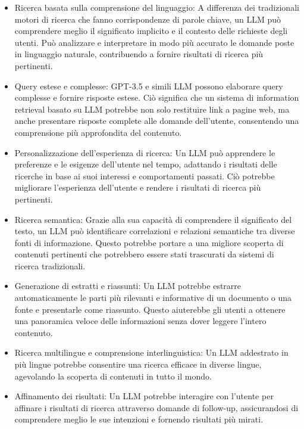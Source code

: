 \begin{itemize}
    \item Ricerca basata sulla comprensione del linguaggio: 
    A differenza dei tradizionali motori di ricerca che fanno corrispondenze di parole chiave, un LLM può comprendere meglio il significato implicito e il contesto delle richieste degli utenti. Può analizzare e interpretare in modo più accurato le domande poste in linguaggio naturale, contribuendo a fornire risultati di ricerca più pertinenti.
    \item Query estese e complesse: GPT-3.5 e simili LLM possono elaborare query complesse e fornire risposte estese. Ciò significa che un sistema di information retrieval basato su LLM potrebbe non solo restituire link a pagine web, ma anche presentare risposte complete alle domande dell'utente, consentendo una comprensione più approfondita del contenuto.
    \item 
    Personalizzazione dell'esperienza di ricerca: Un LLM può apprendere le preferenze e le esigenze dell'utente nel tempo, adattando i risultati delle ricerche in base ai suoi interessi e comportamenti passati. Ciò potrebbe migliorare l'esperienza dell'utente e rendere i risultati di ricerca più pertinenti.
    \item Ricerca semantica: Grazie alla sua capacità di comprendere il significato del testo, un LLM può identificare correlazioni e relazioni semantiche tra diverse fonti di informazione. Questo potrebbe portare a una migliore scoperta di contenuti pertinenti che potrebbero essere stati trascurati da sistemi di ricerca tradizionali.
    \item Generazione di estratti e riassunti: Un LLM potrebbe estrarre automaticamente le parti più rilevanti e informative di un documento o una fonte e presentarle come riassunto. Questo aiuterebbe gli utenti a ottenere una panoramica veloce delle informazioni senza dover leggere l'intero contenuto.

    \item Ricerca multilingue e comprensione interlinguistica: Un LLM addestrato in più lingue potrebbe consentire una ricerca efficace in diverse lingue, agevolando la scoperta di contenuti in tutto il mondo.

    \item Affinamento dei risultati: Un LLM potrebbe interagire con l'utente per affinare i risultati di ricerca attraverso domande di follow-up, assicurandosi di comprendere meglio le sue intenzioni e fornendo risultati più mirati.
    
\end{itemize}